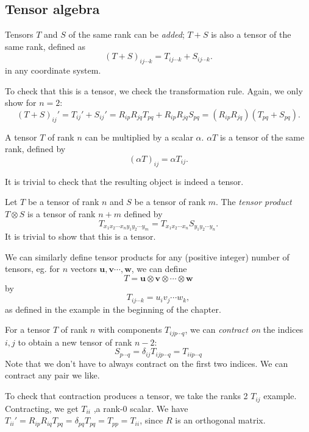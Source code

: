 \documentclass[a4paper]{article}
\begin{document}
\subsection{Tensor algebra}
\begin{defi}
  Tensors $T$ and $S$ of the same rank can be \emph{added}; $T + S$ is also a tensor of the same rank, defined as
  \[
    (T + S)_{ij\cdots k} = T_{ij \cdots k} + S_{ij\cdots k}.
  \]
  in any coordinate system.
\end{defi}
To check that this is a tensor, we check the transformation rule. Again, we only show for $n = 2$:
\[
  (T + S)_{ij}' = T_{ij}' + S_{ij}' = R_{ip}R_{jq}T_{pq} + R_{ip}R_{jq}S_{pq} = (R_{ip}R_{jq})(T_{pq} + S_{pq}).
\]
\begin{defi}
  A tensor $T$ of rank $n$ can be multiplied by a scalar $\alpha$. $\alpha T$ is a tensor of the same rank, defined by
  \[
    (\alpha T)_{ij} = \alpha T_{ij}.
  \]
\end{defi}
It is trivial to check that the resulting object is indeed a tensor.

\begin{defi}
  Let $T$ be a tensor of rank $n$ and $S$ be a tensor of rank $m$. The \emph{tensor product} $T\otimes S$ is a tensor of rank $n + m$ defined by
  \[
    T_{x_1 x_2\cdots x_n y_1y_2\cdots y_m} = T_{x_1x_2\cdots x_n}S_{y_1y_2\cdots y_n}.
  \]
  It is trivial to show that this is a tensor.

  We can similarly define tensor products for any (positive integer) number of tensors, eg. for $n$ vectors $\mathbf{u}, \mathbf{v} \cdots, \mathbf{w}$, we can define
  \[
    T = \mathbf{u}\otimes \mathbf{v}\otimes \cdots \otimes \mathbf{w}
  \]
  by
  \[
    T_{ij\cdots k} = u_i v_j \cdots w_k,
  \]
  as defined in the example in the beginning of the chapter.
\end{defi}

\begin{defi}
  For a tensor $T$ of rank $n$ with components $T_{ijp\cdots q}$, we can \emph{contract on} the indices $i, j$ to obtain a new tensor of rank $n - 2$:
  \[
    S_{p\cdots q} = \delta_{ij}T_{ij p\cdots q} = T_{iip\cdots q}
  \]
  Note that we don't have to always contract on the first two indices. We can contract any pair we like.
\end{defi}
To check that contraction produces a tensor, we take the ranks 2 $T_{ij}$ example. Contracting, we get $T_{ii}$ ,a rank-0 scalar. We have $T_{ii}' = R_{ip}R_{iq}T_{pq} = \delta_{pq}T_{pq} = T_{pp} = T_{ii}$, since $R$ is an orthogonal matrix.
\end{document}
